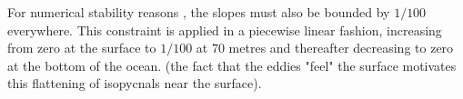 {%





For numerical stability reasons \citep{Cox1987, Griffies_Bk04}, the slopes must also 
be bounded by $1/100$ everywhere. This constraint is applied in a piecewise linear 
fashion, increasing from zero at the surface to $1/100$ at $70$ metres and thereafter 
decreasing to zero at the bottom of the ocean. (the fact that the eddies "feel" the 
surface motivates this flattening of isopycnals near the surface).

}
